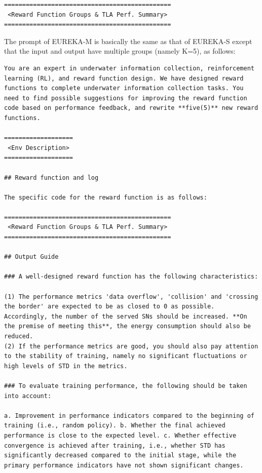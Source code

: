 \documentclass{article}
\begin{document}
\begin{verbatim}
==============================================
 <Reward Function Groups & TLA Perf. Summary>
==============================================
\end{verbatim}

The prompt of EUREKA-M is basically the same as that of EUREKA-S except that the input and output have multiple groups (namely K=5), as follows:

\begin{verbatim}
You are an expert in underwater information collection, reinforcement learning (RL), and reward function design. We have designed reward functions to complete underwater information collection tasks. You need to find possible suggestions for improving the reward function code based on performance feedback, and rewrite **five(5)** new reward functions.

===================
 <Env Description>
===================

## Reward function and log

The specific code for the reward function is as follows:

==============================================
 <Reward Function Groups & TLA Perf. Summary>
==============================================

## Output Guide

### A well-designed reward function has the following characteristics:

(1) The performance metrics 'data overflow', 'collision' and 'crossing the border' are expected to be as closed to 0 as possible. Accordingly, the number of the served SNs should be increased. **On the premise of meeting this**, the energy consumption should also be reduced.
(2) If the performance metrics are good, you should also pay attention to the stability of training, namely no significant fluctuations or high levels of STD in the metrics.

### To evaluate training performance, the following should be taken into account:

a. Improvement in performance indicators compared to the beginning of training (i.e., random policy). b. Whether the final achieved performance is close to the expected level. c. Whether effective convergence is achieved after training, i.e., whether STD has significantly decreased compared to the initial stage, while the primary performance indicators have not shown significant changes.


\end{verbatim}
\end{document}
